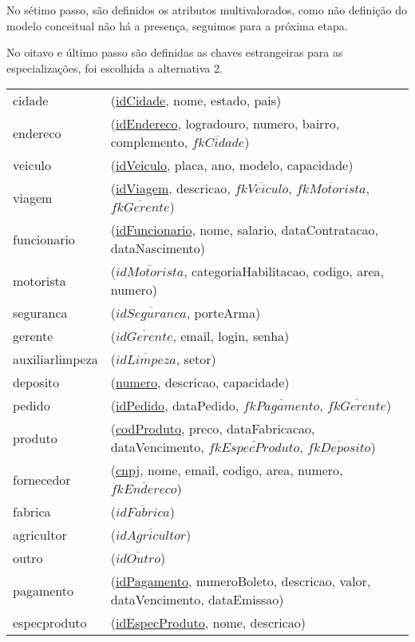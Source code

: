 \documentclass[12pt, onecolumn, titlepage]{article}
\begin{document}
No sétimo passo, são definidos os atributos multivalorados, como não definição do modelo conceitual não há a presença, seguimos para a próxima etapa.

No oitavo e último passo são definidas as chaves estrangeiras para as especializações, foi escolhida a alternativa 2.

\begin{table}[htb!]
\begin{center}
\begin{tabular}{p{2.5cm} p{10.5cm}}
cidade & (\underline{idCidade}, nome, estado, pais) \\
endereco & (\underline{idEndereco}, logradouro, numero, bairro, complemento, $\overline{fkCidade}$) \\
veiculo & (\underline{idVeiculo}, placa, ano, modelo, capacidade) \\
viagem & (\underline{idViagem}, descricao, $\overline{fkVeiculo}$, $\overline{fkMotorista}$, $\overline{fkGerente}$) \\
funcionario & (\underline{idFuncionario}, nome, salario, dataContratacao, dataNascimento)\\
motorista & (\underline{$\overline{idMotorista}$}, categoriaHabilitacao, codigo, area, numero)\\
seguranca & (\underline{$\overline{idSeguranca}$}, porteArma)\\
gerente & (\underline{$\overline{idGerente}$}, email, login, senha)\\
auxiliarlimpeza & (\underline{$\overline{idLimpeza}$}, setor)\\
deposito & (\underline{numero}, descricao, capacidade)\\
pedido & (\underline{idPedido}, dataPedido, $\overline{fkPagamento}$, $\overline{fkGerente}$)\\
produto & (\underline{codProduto}, preco, dataFabricacao, dataVencimento, $\overline{fkEspecProduto}$, $\overline{fkDeposito}$)\\
fornecedor & (\underline{cnpj}, nome, email, codigo, area, numero, $\overline{fkEndereco}$)\\
fabrica & (\underline{$\overline{idFabrica}$})\\
agricultor & (\underline{$\overline{idAgricultor}$})\\
outro & (\underline{$\overline{idOutro}$})\\
pagamento & (\underline{idPagamento}, numeroBoleto, descricao, valor, dataVencimento, dataEmissao)\\
especproduto & (\underline{idEspecProduto}, nome, descricao)\\

\end{tabular}
\end{center}
\end{table}
\end{document}
